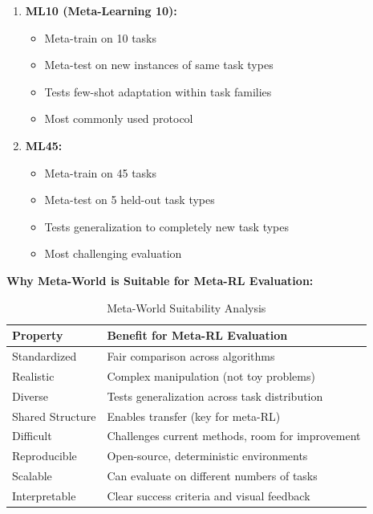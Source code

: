 \documentclass[12pt]{article}
\newcommand{\ieee}[1]{\textcolor{IEEEBlue}{\textbf{#1}}}
\begin{document}
{{\begin{enumerate}
				\item \textbf{ML10 (Meta-Learning 10):}
				\begin{itemize}
					\item Meta-train on 10 tasks
					\item Meta-test on new instances of same task types
					\item Tests few-shot adaptation within task families
					\item Most commonly used protocol
				\end{itemize}
				
				\item \textbf{ML45:}
				\begin{itemize}
					\item Meta-train on 45 tasks
					\item Meta-test on 5 held-out task types
					\item Tests generalization to completely new task types
					\item Most challenging evaluation
				\end{itemize}
			\end{enumerate}
			
			\ieee{Why Meta-World is Suitable for Meta-RL Evaluation:}
			
			\begin{table}[H]
			\centering
			\caption{Meta-World Suitability Analysis}
			\begin{tabular}{@{}ll@{}}
			\toprule
			\textbf{Property} & \textbf{Benefit for Meta-RL Evaluation} \\
			\midrule
			Standardized & Fair comparison across algorithms \\
			Realistic & Complex manipulation (not toy problems) \\
			Diverse & Tests generalization across task distribution \\
			Shared Structure & Enables transfer (key for meta-RL) \\
			Difficult & Challenges current methods, room for improvement \\
			Reproducible & Open-source, deterministic environments \\
			Scalable & Can evaluate on different numbers of tasks \\
			Interpretable & Clear success criteria and visual feedback \\
			\bottomrule
			\end{tabular}
			\label{tab:metaworld_suitability}
			\end{table}
			
}}
\end{document}
